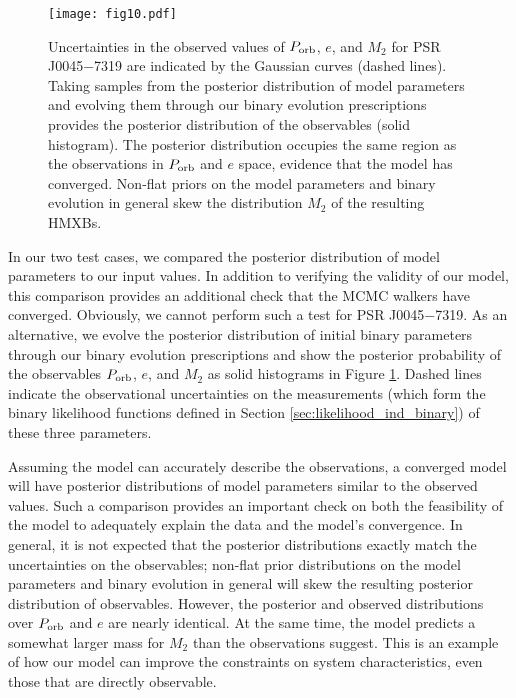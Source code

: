 \documentclass[usenatbib]{mnras}
\begin{document}
\begin{figure*}
\begin{center}
\texttt{[image: fig10.pdf]}
\caption{Uncertainties in the observed values of $P_{\rm orb}$, $e$, and $M_2$ for PSR J0045$-$7319 are indicated by the Gaussian curves (dashed lines). Taking samples from the posterior distribution of model parameters and evolving them through our binary evolution prescriptions provides the posterior distribution of the observables (solid histogram). The posterior distribution occupies the same region as the observations in $P_{\rm orb}$ and $e$ space, evidence that the model has converged. Non-flat priors on the model parameters and binary evolution in general skew the distribution $M_2$ of the resulting HMXBs.}
\label{fig:J0045_forward}
\end{center}
\end{figure*}

In our two test cases, we compared the posterior distribution of model parameters to our input values. In addition to verifying the validity of our model, this comparison provides an additional check that the MCMC walkers have converged. Obviously, we cannot perform such a test for PSR J0045$-$7319. As an alternative, we evolve the posterior distribution of initial binary parameters through our binary evolution prescriptions and show the posterior probability of the observables $P_{\rm orb}$, $e$, and $M_2$ as solid histograms in Figure \ref{fig:J0045_forward}. Dashed lines indicate the observational uncertainties on the measurements (which form the binary likelihood functions defined in Section \ref{sec:likelihood_ind_binary}) of these three parameters. 


Assuming the model can accurately describe the observations, a converged model will have posterior distributions of model parameters similar to the observed values. Such a comparison provides an important check on both the feasibility of the model to adequately explain the data and the model's convergence. In general, it is not expected that the posterior distributions exactly match the uncertainties on the observables; non-flat prior distributions on the model parameters and binary evolution in general will skew the resulting posterior distribution of observables. However, the posterior and observed distributions over $P_{\rm orb}$ and $e$ are nearly identical. At the same time, the model predicts a somewhat larger mass for $M_2$ than the observations suggest. This is an example of how our model can improve the constraints on system characteristics, even those that are directly observable.
\end{document}
